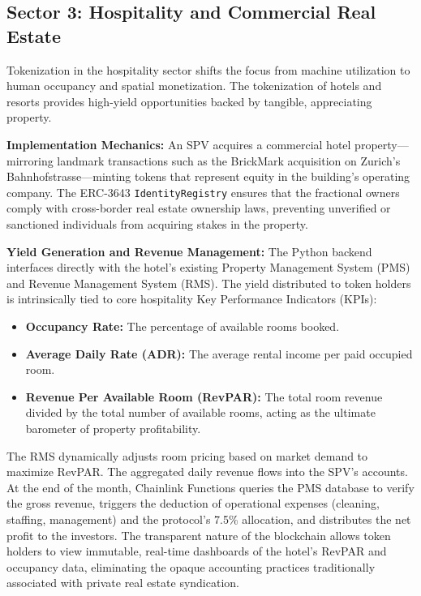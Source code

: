 \documentclass[12pt, a4paper]{article}
\begin{document}
\subsection{Sector 3: Hospitality and Commercial Real Estate}
Tokenization in the hospitality sector shifts the focus from machine utilization to human occupancy and spatial monetization. The tokenization of hotels and resorts provides high-yield opportunities backed by tangible, appreciating property.

\textbf{Implementation Mechanics:}
An SPV acquires a commercial hotel property—mirroring landmark transactions such as the BrickMark acquisition on Zurich's Bahnhofstrasse—minting tokens that represent equity in the building's operating company. The ERC-3643 \texttt{IdentityRegistry} ensures that the fractional owners comply with cross-border real estate ownership laws, preventing unverified or sanctioned individuals from acquiring stakes in the property.

\textbf{Yield Generation and Revenue Management:}
The Python backend interfaces directly with the hotel's existing Property Management System (PMS) and Revenue Management System (RMS). The yield distributed to token holders is intrinsically tied to core hospitality Key Performance Indicators (KPIs):

\begin{itemize}
    \item \textbf{Occupancy Rate:} The percentage of available rooms booked.
    \item \textbf{Average Daily Rate (ADR):} The average rental income per paid occupied room.
    \item \textbf{Revenue Per Available Room (RevPAR):} The total room revenue divided by the total number of available rooms, acting as the ultimate barometer of property profitability.
\end{itemize}

The RMS dynamically adjusts room pricing based on market demand to maximize RevPAR. The aggregated daily revenue flows into the SPV's accounts. At the end of the month, Chainlink Functions queries the PMS database to verify the gross revenue, triggers the deduction of operational expenses (cleaning, staffing, management) and the protocol's 7.5\% allocation, and distributes the net profit to the investors. The transparent nature of the blockchain allows token holders to view immutable, real-time dashboards of the hotel's RevPAR and occupancy data, eliminating the opaque accounting practices traditionally associated with private real estate syndication.
\end{document}
